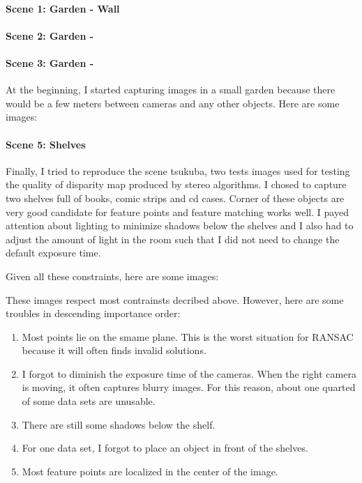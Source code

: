 \documentclass[12pt]{article}
\begin{document}
\paragraph{Scene 1: Garden - Wall}
\paragraph{Scene 2: Garden - }
\paragraph{Scene 3: Garden - }
At the beginning, I started capturing images in a small garden because there would be a few meters between cameras and any other objects. Here are some images:

\paragraph{Scene 5: Shelves}

Finally, I tried to reproduce the scene tsukuba, two tests images used for testing the quality of disparity map produced by stereo algorithms. I chosed to capture two shelves full of books, comic strips and cd cases. Corner of these objects are very good candidate for feature points and feature matching works well. I payed attention about lighting to minimize shadows below the shelves and I also had to adjust the amount of light in the room such that I did not need to change the default exposure time.

Given all these constraints, here are some images:

These images respect most contrainsts decribed above. However, here are some troubles in descending importance order:
\begin{enumerate}
    \item Most points lie on the smame plane. This is the worst situation for RANSAC because it will often finds invalid solutions.
    \item I forgot to diminish the exposure time of the cameras. When the right camera is moving, it often captures blurry images. For this reason, about one quarted of some data sets are unusable.
    \item There are still some shadows below the shelf.
    \item For one data set, I forgot to place an object in front of the shelves.
    \item Most feature points are localized in the center of the image.
\end{enumerate}
\end{document}
